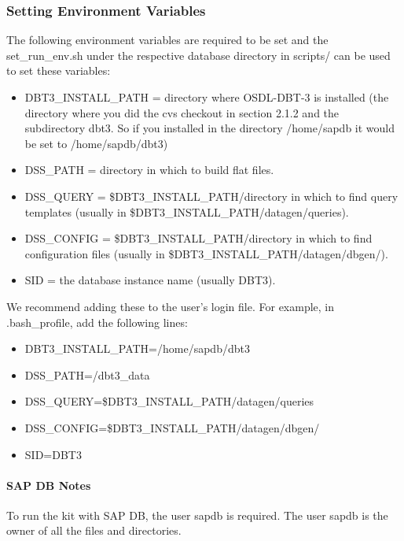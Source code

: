 \documentclass{article}
\begin{document}
\subsubsection{Setting Environment Variables}

\noindent

\noindent
The following environment variables are required to be set and the
set\_run\_env.sh under the respective database directory in scripts/
can be used to set these variables: \\
\begin{itemize}
\item DBT3\_INSTALL\_PATH = directory where OSDL-DBT-3 is installed
      (the directory where you did the cvs checkout in section 2.1.2
      and the subdirectory dbt3.  So if you installed in the directory
      /home/sapdb it would be set to /home/sapdb/dbt3)
\item DSS\_PATH = directory in which to build flat files.
\item DSS\_QUERY = \$DBT3\_INSTALL\_PATH/directory in which to find
      query templates (usually in
      \$DBT3\_INSTALL\_PATH/datagen/queries).
\item DSS\_CONFIG = \$DBT3\_INSTALL\_PATH/directory in which to find
      configuration files (usually in
      \$DBT3\_INSTALL\_PATH/datagen/dbgen/).
\item SID = the database instance name (usually DBT3).
\end{itemize}

\noindent
We recommend adding these to the user's login file.  For example, in
.bash\_profile, add the following lines: \\
\begin{itemize} 
\item DBT3\_INSTALL\_PATH=/home/sapdb/dbt3
\item DSS\_PATH=/dbt3\_data
\item DSS\_QUERY=\$DBT3\_INSTALL\_PATH/datagen/queries
\item DSS\_CONFIG=\$DBT3\_INSTALL\_PATH/datagen/dbgen/
\item SID=DBT3
\end{itemize}

\paragraph{SAP DB Notes}
To run the kit with SAP DB, the user sapdb is required.  The user sapdb
is the owner of all the files and directories.
\end{document}
